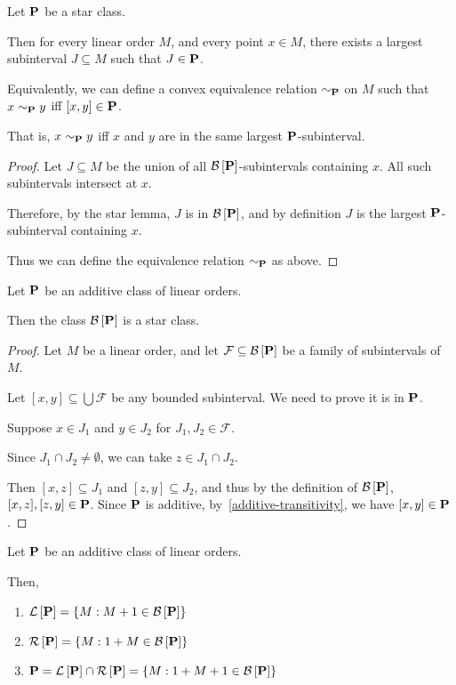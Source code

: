 \begin{lemma}
  Let $\mathbf{P}$ be a star class.

  Then for every linear order $M$,
  and every point $x \in M$, there exists a largest subinterval $J \subseteq M$ such that
  $J \in \mathbf{P}$.

  Equivalently, we can define a convex equivalence relation $\sim_{\mathbf{P}}$ on $M$ such that $x \sim_{\mathbf{P}} y$ iff $[x, y] \in \mathbf{P}$.

  That is,
  $x \sim_{\mathbf{P}} y$ iff $x$ and $y$ are in the same largest $\mathbf{P}$-subinterval.

\end{lemma}

\begin{proof}
  Let $J \subseteq M$ be the union of all $\mathcal{B} \left[ {{\mathbf{P}}} \right]$-subintervals containing $x$.
  All such subintervals intersect at $x$.

  Therefore, by the star lemma, $J$ is in $\mathcal{B} \left[ {{\mathbf{P}}} \right]$, and by definition
  $J$ is the largest $\mathbf{P}$-subinterval containing $x$.

  Thus we can define the equivalence relation $\sim_{\mathbf{P}}$ as above.
\end{proof}

\begin{lemma}\label{star-lemma}
  Let $\mathbf{P}$ be an additive class of linear orders.

  Then the class $\mathcal{B} \left[ {{\mathbf{P}}} \right]$ is a star class.
\end{lemma}

\begin{proof}
  Let $M$ be a linear order,
  and let $\mathcal{F} \subseteq \mathcal{B} \left[ {{\mathbf{P}}} \right]$ be a family of subintervals of $M$.

  Let $[x, y] \subseteq \bigcup \mathcal{F}$ be any bounded subinterval. We need to prove
  it is in $\mathbf{P}$.

  Suppose $x \in J_1$ and $y \in J_2$ for $J_1, J_2 \in \mathcal{F}$.

  Since $J_1 \cap J_2 \ne \emptyset$, we can take $z \in J_1 \cap J_2$.

  Then $[x, z] \subseteq J_1$ and $[z, y] \subseteq J_2$,
  and thus by the definition of $\mathcal{B} \left[ {{\mathbf{P}}} \right]$, $[x, z], [z, y] \in \mathbf{P}$.
  Since $\mathbf{P}$ is additive, by~\cref{additive-transitivity}, we have $[x, y] \in \mathbf{P}$.
\end{proof}

\begin{lemma}\label{bounded-classes}
  Let $\mathbf{P}$ be an additive class of linear orders.

  Then,
  \begin{enumerate}
    \item $\mathcal{L} \left[ {{\mathbf{P}}} \right] = \left\{ {M : M + 1 \in \mathcal{B} \left[ {{\mathbf{P}}} \right]} \right\}$
    \item $\mathcal{R} \left[ {{\mathbf{P}}} \right] = \left\{ {M : 1 + M \in \mathcal{B} \left[ {{\mathbf{P}}} \right]} \right\}$
    \item $\mathbf{P} = \mathcal{L} \left[ {{\mathbf{P}}} \right] \cap \mathcal{R} \left[ {{\mathbf{P}}} \right] = \left\{ {M : 1 + M + 1 \in \mathcal{B} \left[ {{\mathbf{P}}} \right]} \right\}$
  \end{enumerate}
\end{lemma}

